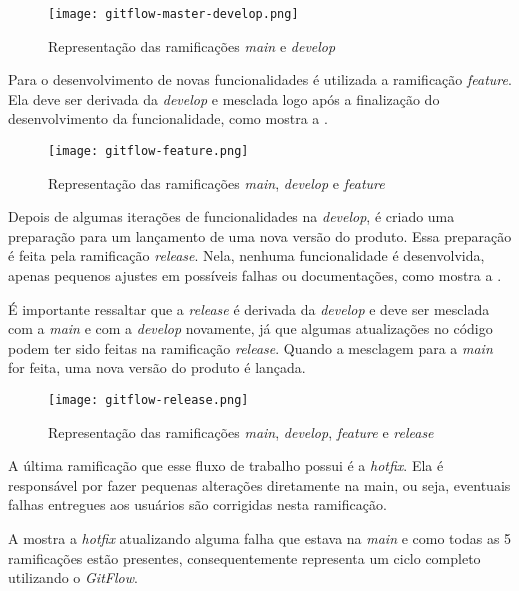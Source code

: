 \begin{figure}[!htb]
    \centering
    \texttt{[image: gitflow-master-develop.png]}
    \caption{Representação das ramificações \textit{main} e \textit{develop}}
    \label{fig:gitflow1}
\end{figure}

Para o desenvolvimento de novas funcionalidades é utilizada a ramificação \textit{feature}. Ela deve ser derivada da \textit{develop} e mesclada logo após a finalização do desenvolvimento da funcionalidade, como mostra a .

\begin{figure}[!htb]
    \centering
    \texttt{[image: gitflow-feature.png]}
    \caption{Representação das ramificações \textit{main}, \textit{develop} e \textit{feature}}
    \label{fig:gitflow2}
\end{figure}

Depois de algumas iterações de funcionalidades na \textit{develop}, é criado uma preparação para um lançamento de uma nova versão do produto. Essa preparação é feita pela ramificação \textit{release}. Nela, nenhuma funcionalidade é desenvolvida, apenas pequenos ajustes em possíveis falhas ou documentações, como mostra a .

É importante ressaltar que a \textit{release} é derivada da \textit{develop} e deve ser mesclada com a \textit{main} e com a  \textit{develop} novamente, já que algumas atualizações no código podem ter sido feitas na ramificação \textit{release}. Quando a mesclagem para a \textit{main} for feita, uma nova versão do produto é lançada.

\begin{figure}[!htb]
    \centering
    \texttt{[image: gitflow-release.png]}
    \caption{Representação das ramificações \textit{main}, \textit{develop}, \textit{feature} e \textit{release}}
    \label{fig:gitflow3}
\end{figure}

A última ramificação que esse fluxo de trabalho possui é a \textit{hotfix}. Ela é responsável por fazer pequenas alterações diretamente na main, ou seja, eventuais falhas entregues aos usuários são corrigidas nesta ramificação.

A   mostra a \textit{hotfix} atualizando alguma falha que estava na \textit{main} e como todas as 5 ramificações estão presentes, consequentemente representa um ciclo completo utilizando o \textit{GitFlow}.

